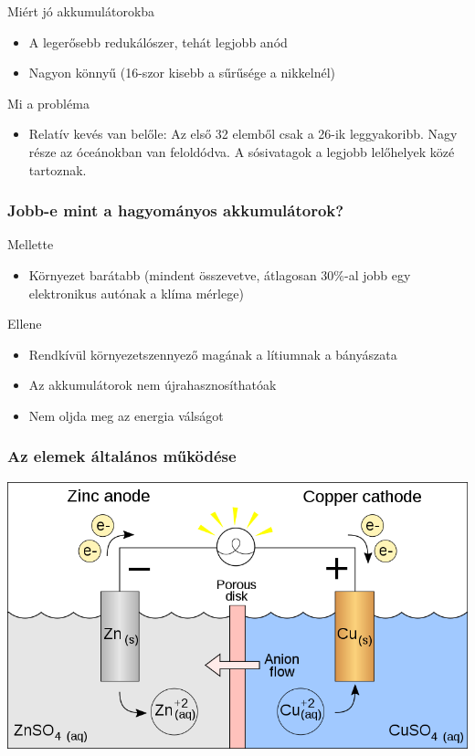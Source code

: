 \documentclass{beamer}
\begin{document}
\begin{frame}
\begin{block}{Miért jó akkumulátorokba}
\begin{itemize}
\item A legerősebb redukálószer, tehát legjobb anód
\item Nagyon könnyű (16-szor kisebb a sűrűsége a nikkelnél)
\end{itemize}
\end{block}

\begin{block}{Mi a probléma}
\begin{itemize}
\item Relatív kevés van belőle: Az első 32 elemből csak a 26-ik leggyakoribb. Nagy része az óceánokban van feloldódva. A sósivatagok a legjobb lelőhelyek közé tartoznak.
\end{itemize}
\end{block}
\end{frame}

\begin{frame}
\frametitle{
Jobb-e mint a hagyományos akkumulátorok?}
\begin{block}{Mellette}
\begin{itemize}
\item Környezet barátabb (mindent összevetve, átlagosan 30\%-al jobb egy elektronikus autónak a klíma mérlege)
\end{itemize}
\end{block}

\begin{block}{Ellene}
\begin{itemize}
\item Rendkívül környezetszennyező magának a lítiumnak a bányászata
\item Az akkumulátorok nem újrahasznosíthatóak
\item Nem oljda meg az energia válságot
\end{itemize}
\end{block}
\end{frame}

\begin{frame}
\frametitle{Az elemek általános működése}
\begin{center}
\includegraphics[scale=0.3]{galvanicbattery}
\end{center}
\end{frame}
\end{document}
